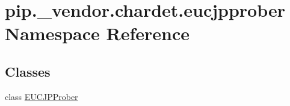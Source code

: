 \hypertarget{namespacepip_1_1__vendor_1_1chardet_1_1eucjpprober}{}\section{pip.\+\_\+vendor.\+chardet.\+eucjpprober Namespace Reference}
\label{namespacepip_1_1__vendor_1_1chardet_1_1eucjpprober}
\subsection*{Classes}
\begin{DoxyCompactItemize}
\item 
class \hyperlink{classpip_1_1__vendor_1_1chardet_1_1eucjpprober_1_1EUCJPProber}{E\+U\+C\+J\+P\+Prober}
\end{DoxyCompactItemize}
